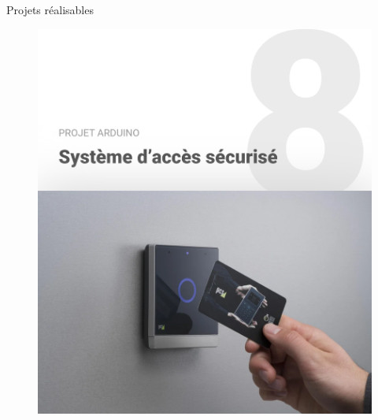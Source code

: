 \documentclass[]{beamer}
\begin{document}
	\begin{frame}
	{Projets réalisables}
			\begin{figure}
				\begin{center}
					\includegraphics[scale=0.4]{securite.png}
				\end{center}
			\end{figure}
	\end{frame}
\end{document}
